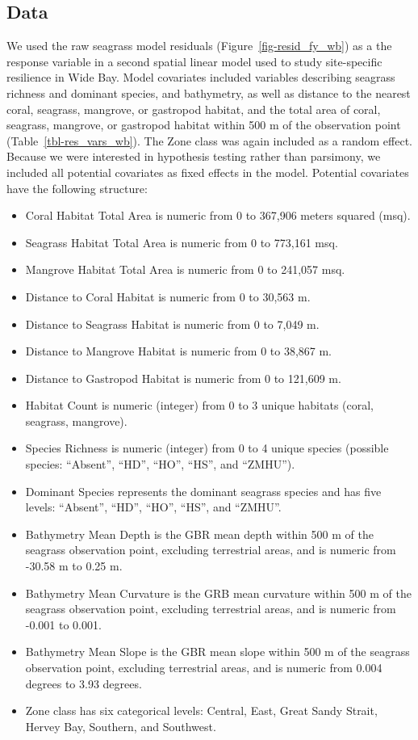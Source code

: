 \documentclass[
  letterpaper,
  DIV=11,
  numbers=noendperiod]{scrartcl}
\providecommand{\tightlist}{%
  \setlength{\itemsep}{0pt}\setlength{\parskip}{0pt}}
\begin{document}
\subsection{Data}\label{data-1}

We used the raw seagrass model residuals (Figure~\ref{fig-resid_fy_wb})
as a the response variable in a second spatial linear model used to
study site-specific resilience in Wide Bay. Model covariates included
variables describing seagrass richness and dominant species, and
bathymetry, as well as distance to the nearest coral, seagrass,
mangrove, or gastropod habitat, and the total area of coral, seagrass,
mangrove, or gastropod habitat within 500 m of the observation point
(Table~\ref{tbl-res_vars_wb}). The Zone class was again included as a
random effect. Because we were interested in hypothesis testing rather
than parsimony, we included all potential covariates as fixed effects in
the model. Potential covariates have the following structure:

\begin{itemize}
\tightlist
\item
  Coral Habitat Total Area is numeric from 0 to 367,906 meters squared
  (msq).
\item
  Seagrass Habitat Total Area is numeric from 0 to 773,161 msq.
\item
  Mangrove Habitat Total Area is numeric from 0 to 241,057 msq.
\item
  Distance to Coral Habitat is numeric from 0 to 30,563 m.
\item
  Distance to Seagrass Habitat is numeric from 0 to 7,049 m.
\item
  Distance to Mangrove Habitat is numeric from 0 to 38,867 m.
\item
  Distance to Gastropod Habitat is numeric from 0 to 121,609 m.
\item
  Habitat Count is numeric (integer) from 0 to 3 unique habitats (coral,
  seagrass, mangrove).
\item
  Species Richness is numeric (integer) from 0 to 4 unique species
  (possible species: ``Absent'', ``HD'', ``HO'', ``HS'', and ``ZMHU'').
\item
  Dominant Species represents the dominant seagrass species and has five
  levels: ``Absent'', ``HD'', ``HO'', ``HS'', and ``ZMHU''.
\item
  Bathymetry Mean Depth is the GBR mean depth within 500 m of the
  seagrass observation point, excluding terrestrial areas, and is
  numeric from -30.58 m to 0.25 m.
\item
  Bathymetry Mean Curvature is the GRB mean curvature within 500 m of
  the seagrass observation point, excluding terrestrial areas, and is
  numeric from -0.001 to 0.001.
\item
  Bathymetry Mean Slope is the GBR mean slope within 500 m of the
  seagrass observation point, excluding terrestrial areas, and is
  numeric from 0.004 degrees to 3.93 degrees.
\item
  Zone class has six categorical levels: Central, East, Great Sandy
  Strait, Hervey Bay, Southern, and Southwest.
\end{itemize}
\end{document}
